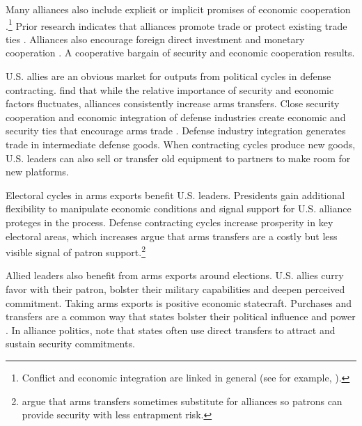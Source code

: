 \documentclass[12pt]{article}
\begin{document}
Many alliances also include explicit or implicit promises of economic cooperation \citep{GowaMansfield2004, LongLeeds2006, Davis2008, Poast2012}.\footnote{Conflict and economic integration are linked in general (see for example, \citep{GartzkeLi2003, Chen2021}).}
Prior research indicates that alliances promote trade \citep{Gowa1995, GowaMansfield2004, Haim2016} or protect existing trade ties \citep{Fordham2010}.
Alliances also encourage foreign direct investment \citep{LiVashchilko2010} and monetary cooperation \citep{Li2003}.
A cooperative bargain of security and economic cooperation results. 


U.S. allies are an obvious market for outputs from political cycles in defense contracting.
\citet{Thurneretal2019} find that while the relative importance of security and economic factors fluctuates, alliances consistently increase arms transfers.
Close security cooperation and economic integration of defense industries create economic and security ties that encourage arms trade \citep{Bitzinger1994}. 
Defense industry integration generates trade in intermediate defense goods. 
When contracting cycles produce new goods, U.S. leaders can also sell or transfer old equipment to partners to make room for new platforms.


Electoral cycles in arms exports benefit U.S. leaders.
Presidents gain additional flexibility to manipulate economic conditions and signal support for U.S. alliance proteges in the process.
Defense contracting cycles increase prosperity in key electoral areas, which increases 
\citet{McManusYarhi-Milo2017} argue that arms transfers are a costly but less visible signal of patron support.\footnote{\citet{Yarhi-Miloetal2016} argue that arms transfers sometimes substitute for alliances so patrons can provide security with less entrapment risk.}


Allied leaders also benefit from arms exports around elections.
U.S. allies curry favor with their patron, bolster their military capabilities and deepen perceived commitment.
Taking arms exports is positive economic statecraft. 
Purchases and transfers are a common way that states bolster their political influence and power \citep[pg. 42-3]{Baldwin2020}.
In alliance politics, \citet[pg. 184-5]{IkenberryGrieco2003} note that states often use direct transfers to attract and sustain security commitments.  
\end{document}
